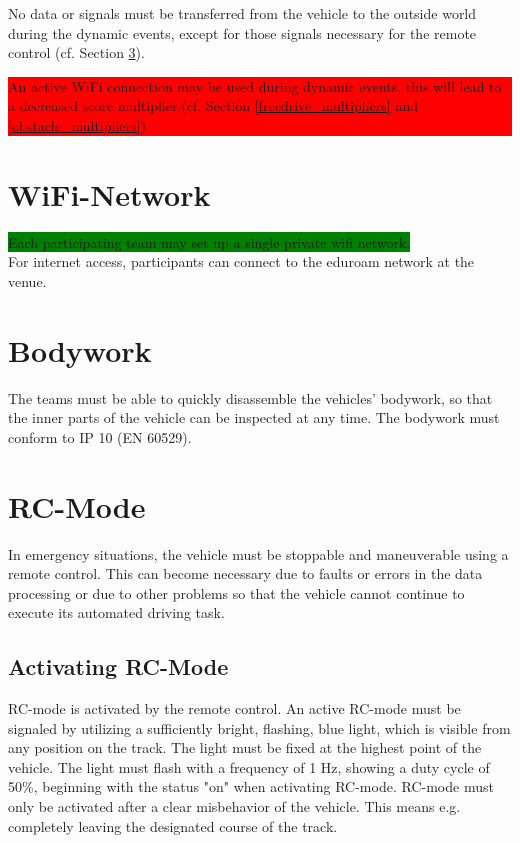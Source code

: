 \documentclass[a4paper]{report}
\newlength\colorboxwidth
\begin{document}
No data or signals must be transferred from the vehicle to the outside world
during the dynamic events, except for those signals necessary for the remote
control (cf. Section \ref{rc_mode}).\\
\colorbox{red}{\parbox{\colorboxwidth}{An active WiFi connection may be used
		during dynamic events, this will lead to a decreased score multiplier.(cf.
		Section \ref{freedrive_multipliers} and \ref{obstacle_multipliers})}}

\section{WiFi-Network}

\colorbox{green}{Each participating team may set up a single private wifi network.}\\
For internet access, participants can connect to the eduroam network at the venue.\\

\section{Bodywork}

The teams must be able to quickly disassemble the vehicles’ bodywork, so that
the inner parts of the vehicle can be inspected at any time. The bodywork must
conform to IP 10 (EN 60529).

\section{RC-Mode}
\label{rc_mode}

In emergency situations, the vehicle must be stoppable and maneuverable using a
remote control. This can become necessary due to faults or errors in the data
processing or due to other problems so that the vehicle cannot continue to
execute its automated driving task.

\subsection{Activating RC-Mode}

RC-mode is activated by the remote control. An active RC-mode must be signaled
by utilizing a sufficiently bright, flashing, blue light, which is visible from
any position on the track. The light must be fixed at the highest point of the
vehicle. The light must flash with a frequency of 1 Hz, showing a duty cycle of
50\%, beginning with the status "on" when activating RC-mode. RC-mode must only
be activated after a clear misbehavior of the vehicle. This means e.g.
completely leaving the designated course of the track.
\end{document}
